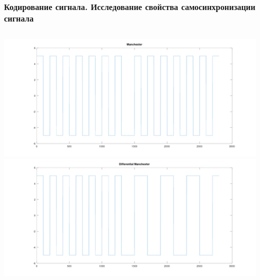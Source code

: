 \begin{frame}
\frametitle{Кодирование сигнала. Исследование свойства самосинхронизации сигнала}
\begin{columns}
            \includegraphics[width=\textwidth]{../octave/coding/sync/manchester.png}
            \includegraphics[width=\textwidth]{../octave/coding/sync/diffmanc.png}
\end{columns}
\end{frame}


